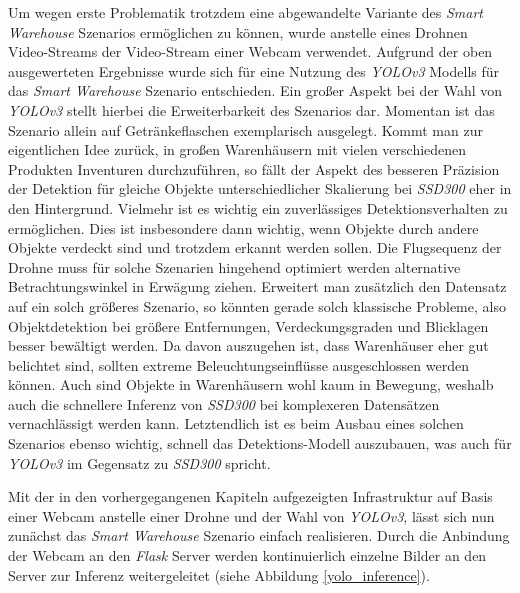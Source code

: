 Um wegen erste Problematik trotzdem eine abgewandelte Variante des \textit{Smart Warehouse} Szenarios ermöglichen zu können, wurde anstelle eines Drohnen Video-Streams der Video-Stream einer Webcam verwendet. Aufgrund der oben ausgewerteten Ergebnisse wurde sich für eine Nutzung des \textit{YOLOv3} Modells für das \textit{Smart Warehouse} Szenario entschieden. Ein großer Aspekt bei der Wahl von \textit{YOLOv3} stellt hierbei die Erweiterbarkeit des Szenarios dar. Momentan ist das Szenario allein auf Getränkeflaschen exemplarisch ausgelegt. Kommt man zur eigentlichen Idee zurück, in großen Warenhäusern mit vielen verschiedenen Produkten Inventuren durchzuführen, so fällt der Aspekt des besseren Präzision der Detektion für gleiche Objekte unterschiedlicher Skalierung bei \textit{SSD300} eher in den Hintergrund. Vielmehr ist es wichtig ein zuverlässiges Detektionsverhalten zu ermöglichen. Dies ist insbesondere dann wichtig, wenn Objekte durch andere Objekte verdeckt sind und trotzdem erkannt werden sollen. Die Flugsequenz der Drohne muss für solche Szenarien hingehend optimiert werden alternative Betrachtungswinkel in Erwägung ziehen. Erweitert man zusätzlich den Datensatz auf ein solch größeres Szenario, so könnten gerade solch klassische Probleme, also Objektdetektion bei größere Entfernungen, Verdeckungsgraden und Blicklagen besser bewältigt werden. Da davon auszugehen ist, dass Warenhäuser eher gut belichtet sind, sollten extreme Beleuchtungseinflüsse ausgeschlossen werden können. Auch sind Objekte in Warenhäusern wohl kaum in Bewegung, weshalb auch die schnellere Inferenz von \textit{SSD300} bei komplexeren Datensätzen vernachlässigt werden kann. Letztendlich ist es beim Ausbau eines solchen Szenarios ebenso wichtig, schnell das Detektions-Modell auszubauen, was auch für \textit{YOLOv3} im Gegensatz zu \textit{SSD300} spricht. 

Mit der in den vorhergegangenen Kapiteln aufgezeigten Infrastruktur auf Basis einer Webcam anstelle einer Drohne und der Wahl von \textit{YOLOv3}, lässt sich nun zunächst das \textit{Smart Warehouse} Szenario einfach realisieren. Durch die Anbindung der Webcam an den \textit{Flask} Server werden kontinuierlich einzelne Bilder an den Server zur Inferenz weitergeleitet (siehe Abbildung \ref{yolo_inference}). 

